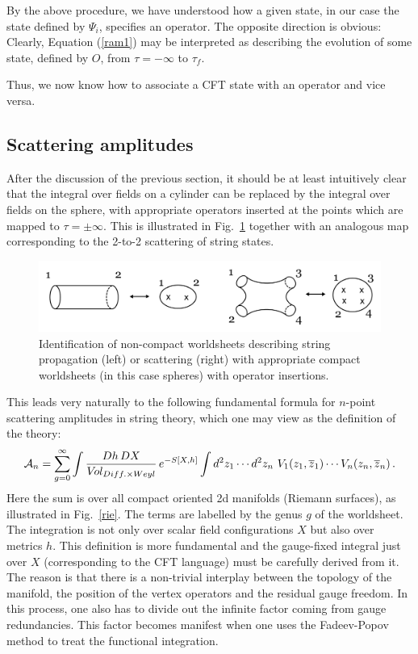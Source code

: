 \documentclass[12pt]{article}
\newcommand{\be}{\begin{equation}}
\newcommand{\ee}{\end{equation}}
\newcommand{\ol}{\overline}
\numberwithin{equation}{section}
\begin{document}
By the above procedure, we have understood how a given state, in our case the state defined by $\Psi_i$, specifies an operator. The opposite direction is obvious: Clearly, Equation (\ref{ram1}) may be interpreted as describing the evolution of some state, defined by $O$, from $\tau=-\infty$ to $\tau_f$. 

Thus, we now know how to associate a CFT state with an operator and vice versa. 






\subsection{Scattering amplitudes}
After the discussion of the previous section, it should be at least intuitively clear that the integral over fields on a cylinder can be replaced by the integral over fields on the sphere, with appropriate operators inserted at the points which are mapped to $\tau=\pm \infty$. This is illustrated in Fig.~\ref{sca} together with an analogous map corresponding to the 2-to-2 scattering of string states.

\begin{figure}[ht]
\begin{center} 
\includegraphics[width=12cm]{sca.png}
\caption{Identification of non-compact worldsheets describing string propagation (left) or scattering (right) with appropriate compact worldsheets (in this case spheres) with operator insertions.}
\label{sca} 
\end{center}
\end{figure}

This leads very naturally to the following fundamental formula for $n$-point scattering amplitudes in string theory, which one may view as the definition of the theory:
\be
{\cal A}_n=\sum_{g=0}^{\infty}\int\frac{Dh\,DX}{V\!ol_{Diff.\times Weyl}}\,e^{-S[X,h]}\int d^2 z_1\cdots d^2 z_n\,\,V_1(z_1,\ol{z}_1)\cdots 
V_n(z_n,\ol{z}_n)\,.
\ee
Here the sum is over all compact oriented 2d manifolds (Riemann surfaces), as illustrated in Fig.~\ref{rie}. The terms are labelled by the genus $g$ of the worldsheet. The integration is not only over scalar field configurations $X$ but also over metrics $h$. This definition is more fundamental and the gauge-fixed integral just over $X$ (corresponding to the CFT language) must be carefully derived from it. The reason is that there is a non-trivial interplay between the topology of the manifold, the position of the vertex operators and the residual gauge freedom. In this process, one also has to divide out the infinite factor coming from gauge redundancies. This factor becomes manifest when one uses the Fadeev-Popov method to treat the functional integration. 
\end{document}
